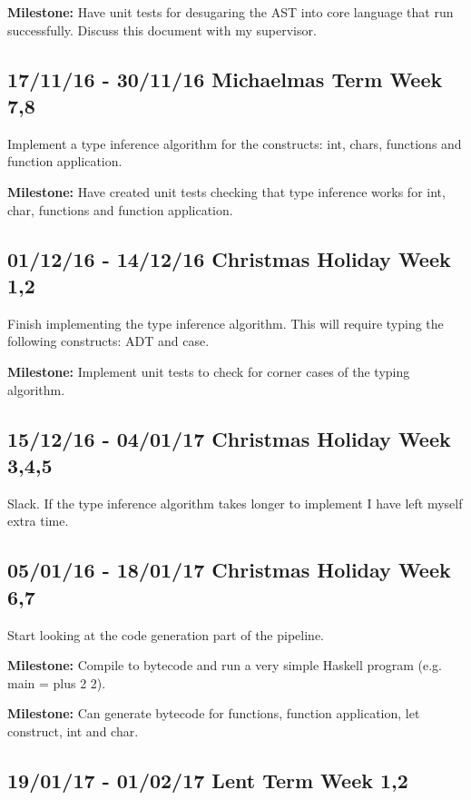 \documentclass[12pt,a4paper,twoside]{article}
\begin{document}
      \textbf{Milestone:} Have unit tests for desugaring the AST into core language that run successfully.
      Discuss this document with my supervisor.


    \subsection*{17/11/16 - 30/11/16 \hfill Michaelmas Term  Week 7,8}

      Implement a type inference algorithm for the constructs: int, chars, functions and function application.

      \textbf{Milestone:} Have created unit tests checking that type inference works for int, char, functions and function application.

    \subsection*{01/12/16 - 14/12/16 \hfill Christmas Holiday Week 1,2}

    Finish implementing the type inference algorithm. This will require typing the following constructs: ADT and case.

    \textbf{Milestone:} Implement unit tests to check for corner cases of the typing algorithm.

    \subsection*{15/12/16 - 04/01/17 \hfill Christmas Holiday Week  3,4,5}

    Slack. If the type inference algorithm takes longer to implement I have left myself extra time.

    \subsection*{05/01/16 - 18/01/17 \hfill Christmas Holiday Week 6,7}

    Start looking at the code generation part of the pipeline.

    \textbf{Milestone:} Compile to bytecode and run a very simple Haskell program (e.g. main = plus 2 2).

    \textbf{Milestone:} Can generate bytecode for functions, function application, let construct, int and char.

    \subsection*{19/01/17 - 01/02/17 \hfill Lent Term Week 1,2}
\end{document}
